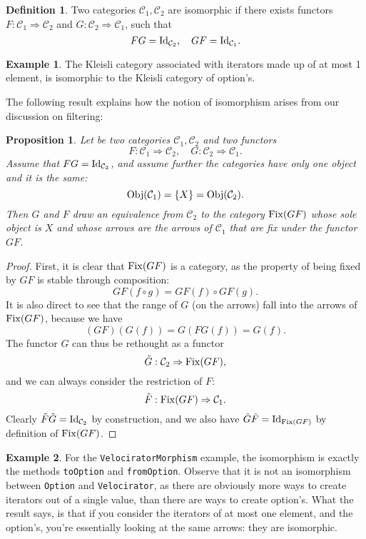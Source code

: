 \documentclass[12pt,a4paper]{report}
\theoremstyle{theorem}
\newtheorem{proposition}{Proposition}
\theoremstyle{definition}
\newtheorem{definition}{Definition}
\newtheorem{example}{Example}
\begin{document}
\begin{definition}
Two categories $\mathcal{C}_1,\mathcal{C}_2$ are isomorphic if there
exists functors $F : \mathcal{C}_1\Rightarrow \mathcal{C}_2$ and
$G : \mathcal{C}_2\Rightarrow \mathcal{C}_1$, such that
	\[ FG = {\rm Id}_{\mathcal{C}_2} ,\quad GF = {\rm Id}_{\mathcal{C}_1} .\]
\end{definition}

\begin{example}
The Kleisli category associated with iterators made up of at most 1 element,
is isomorphic to the Kleisli category of option's.
\end{example}

The following result explains how the notion of isomorphism
arises from our discussion on filtering:

\begin{proposition}
Let be two categories $\mathcal{C}_1,\mathcal{C}_2$ and two functors
	\[ F : \mathcal{C}_1\Rightarrow \mathcal{C}_2,
		\quad G : \mathcal{C}_2\Rightarrow \mathcal{C}_1 .\]
Assume that $FG={\rm Id}_{\mathcal{C}_2}$, and assume further the
categories have only one object and it is the same:
	\[ {\rm Obj}(\mathcal{C}_1) = \{ X \}= {\rm Obj}(\mathcal{C}_2).\]
Then $G$ and $F$ draw an equivalence from $\mathcal{C}_2$ to the category
${\rm Fix}(GF)$ whose sole object is $X$ and whose arrows
are the arrows of $\mathcal{C}_1$ that are fix under the functor $GF$.
\end{proposition}
\begin{proof}
First, it is clear that ${\rm Fix}(GF)$ is a category, as the property
of being fixed by $GF$ is stable through composition:
	\[ GF(f\circ g) = GF(f) \circ GF(g) .\]
It is also direct to see that the range of $G$ (on the arrows) fall into
the arrows of ${\rm Fix}(GF)$, because we have
	\[ (GF)(G(f)) = G(FG(f)) = G(f) .\]
The functor $G$ can thus be rethought as a functor
	\[ \tilde{G} : \mathcal{C}_2\Rightarrow {\rm Fix}(GF) ,\]
and we can always consider the restriction of $F$:
	\[ \tilde{F} : {\rm Fix}(GF) \Rightarrow \mathcal{C}_1 .\]
Clearly $\tilde{F}\tilde{G}={\rm Id}_{\mathcal{C}_2}$ by construction,
and we also have $\tilde{G}\tilde{F}={\rm Id}_{{\rm Fix}(GF)}$
by definition of ${\rm Fix}(GF)$.
\end{proof}

\begin{example}
For the \lstinline{VelociratorMorphism}{} example,
the isomorphism is exactly the methods
\lstinline{toOption}{} and \lstinline{fromOption}{}.
Observe that it is not an isomorphism between
\lstinline{Option}{} and \lstinline{Velocirator}{}, as there
are obviously more ways to create iterators out of a single value,
than there are ways to create option's. What the result says, is that
if you consider the iterators of at most one element, and the
option's, you're essentially looking at the same arrows: they are
isomorphic.
\end{example}
\end{document}
